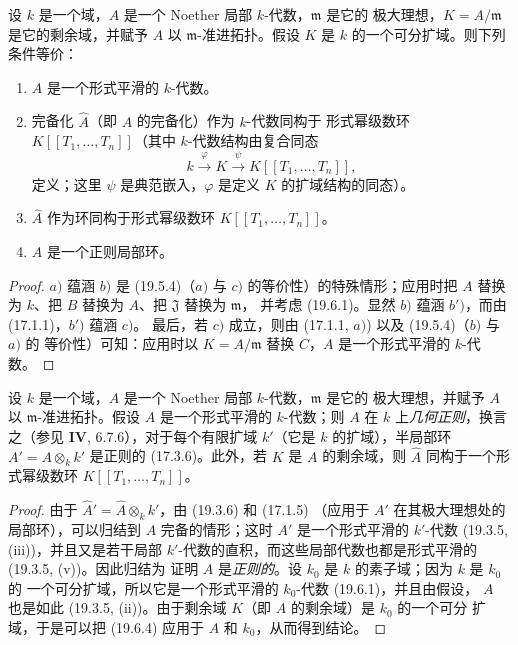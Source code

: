 \begin{theorem}[19.6.4]
\label{0.19.6.4-fr}
设 $k$ 是一个域，$A$ 是一个 Noether 局部 $k$-代数，$\mathfrak m$ 是它的
极大理想，$K=A/\mathfrak m$ 是它的剩余域，并赋予 $A$ 以
$\mathfrak m$-准进拓扑。假设 $K$ 是 $k$ 的一个可分扩域。则下列条件等价：
\begin{enumerate}
  \item[a)] $A$ 是一个形式平滑的 $k$-代数。
  \item[b)] 完备化 $\widehat A$（即 $A$ 的完备化）作为 $k$-代数同构于
  形式幂级数环 $K[[T_1,\ldots,T_n]]$（其中 $k$-代数结构由复合同态
  \[
    k\xrightarrow{\varphi}K\xrightarrow{\psi}K[[T_1,\ldots,T_n]],
  \]
  定义；这里 $\psi$ 是典范嵌入，$\varphi$ 是定义 $K$ 的扩域结构的同态）。
  \item[b')] $\widehat A$ 作为环同构于形式幂级数环
  $K[[T_1,\ldots,T_n]]$。
  \item[c)] $A$ 是一个正则局部环。
\end{enumerate}
\end{theorem}

\begin{proof}
$a)$ 蕴涵 $b)$ 是 (19.5.4)（$a)$ 与 $c)$ 的等价性）的特殊情形；应用时把
$A$ 替换为 $k$、把 $B$ 替换为 $A$、把 $\mathfrak J$ 替换为 $\mathfrak m$，
并考虑 (19.6.1)。显然 $b)$ 蕴涵 $b')$，而由 (17.1.1)，$b')$ 蕴涵 $c)$。
最后，若 $c)$ 成立，则由 (17.1.1, $a)$) 以及 (19.5.4)（$b)$ 与 $a)$ 的
等价性）可知：应用时以 $K=A/\mathfrak m$ 替换 $C$，$A$ 是一个形式平滑的
$k$-代数。
\end{proof}

\begin{corollary}[19.6.5]
\label{0.19.6.5-fr}
设 $k$ 是一个域，$A$ 是一个 Noether 局部 $k$-代数，$\mathfrak m$ 是它的
极大理想，并赋予 $A$ 以 $\mathfrak m$-准进拓扑。假设 $A$ 是一个形式平滑的
$k$-代数；则 $A$ 在 $k$ 上\emph{几何正则}，换言之（参见 $\mathbf{IV}$,
6.7.6），对于每个有限扩域 $k'$（它是 $k$ 的扩域），半局部环
$A'=A\otimes_k k'$ 是正则的 (17.3.6)。此外，若 $K$ 是 $A$ 的剩余域，则
$\widehat A$ 同构于一个形式幂级数环 $K[[T_1,\ldots,T_n]]$。
\end{corollary}

\begin{proof}
由于 $\widehat A'=\widehat A\otimes_k k'$，由 (19.3.6) 和 (17.1.5)
（应用于 $A'$ 在其极大理想处的局部环），可以归结到 $A$ 完备的情形；这时
$A'$ 是一个形式平滑的 $k'$-代数 (19.3.5, (iii))，并且又是若干局部
$k'$-代数的直积，而这些局部代数也都是形式平滑的 (19.3.5, (v))。因此归结为
证明 $A$ 是\emph{正则的}。设 $k_0$ 是 $k$ 的素子域；因为 $k$ 是 $k_0$ 的
一个可分扩域，所以它是一个形式平滑的 $k_0$-代数 (19.6.1)，并且由假设，
$A$ 也是如此 (19.3.5, (ii))。由于剩余域 $K$（即 $A$ 的剩余域）是 $k_0$ 的一个可分
扩域，于是可以把 (19.6.4) 应用于 $A$ 和 $k_0$，从而得到结论。
\end{proof}

